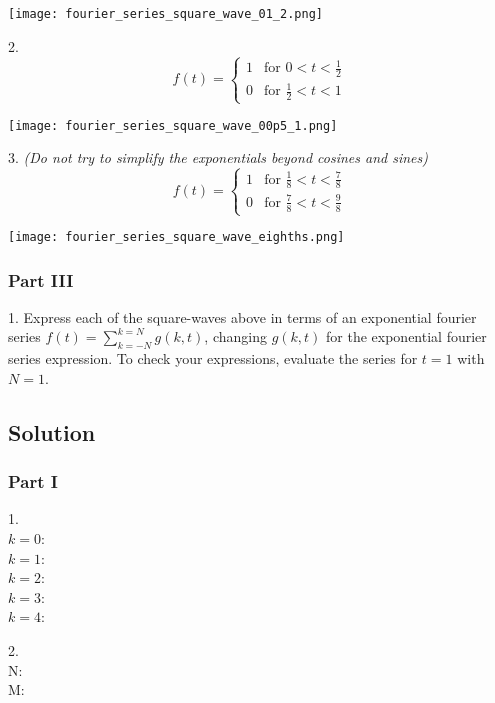 \texttt{[image: fourier\_series\_square\_wave\_01\_2.png]}

\vspace{2em}
2.
\begin{equation}
    f(t)=
    \begin{cases}
        1 & \text{for } 0<t<\frac{1}{2} \\
        0 & \text{for } \frac{1}{2}<t<1
    \end{cases}
\end{equation}

\texttt{[image: fourier\_series\_square\_wave\_00p5\_1.png]}

\vspace{2em}
3. \emph{(Do not try to simplify the exponentials beyond cosines and sines)}
\begin{equation}
    f(t)=
    \begin{cases}
        1 & \text{for } \frac{1}{8}<t<\frac{7}{8} \\
        0 & \text{for } \frac{7}{8}<t<\frac{9}{8}
    \end{cases}
\end{equation}

\texttt{[image: fourier\_series\_square\_wave\_eighths.png]}

\subsubsection*{Part III}
1. Express each of the square-waves above in terms of an exponential fourier series $f(t)=\sum_{k=-N}^{k=N} g(k,t)$, changing $g(k,t)$ for the exponential fourier series expression. To check your expressions, evaluate the series for $t=1$ with $N=1$.

\subsection*{Solution}
\subsubsection*{Part I}
1.\\
$k=0$: \\
$k=1$: \\
$k=2$: \\
$k=3$: \\
$k=4$: 

2.\\
N: \\
M: 

